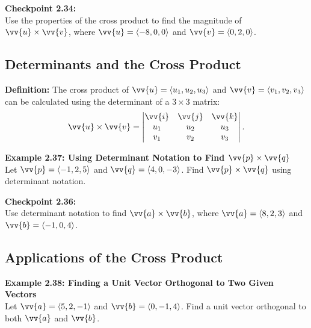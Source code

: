 \documentclass{article}
\begin{document}
\begin{exercisebox}
    \textbf{Checkpoint 2.34:} \\
    Use the properties of the cross product to find the magnitude of \(\vv{u} \times \vv{v}\), where \(\vv{u} = \langle -8, 0, 0 \rangle\) and \(\vv{v} = \langle 0, 2, 0 \rangle\).
\end{exercisebox}

\subsection*{Determinants and the Cross Product}

\begin{definitionbox}
    \textbf{Definition:} The cross product of \(\vv{u} = \langle u_1, u_2, u_3 \rangle\) and \(\vv{v} = \langle v_1, v_2, v_3 \rangle\) can be calculated using the determinant of a \(3 \times 3\) matrix:
    \[
    \vv{u} \times \vv{v} = \begin{vmatrix}
    \vv{i} & \vv{j} & \vv{k} \\
    u_1 & u_2 & u_3 \\
    v_1 & v_2 & v_3
    \end{vmatrix}.
    \]
\end{definitionbox}

\begin{examplebox}
    \textbf{Example 2.37: Using Determinant Notation to Find \(\vv{p} \times \vv{q}\)} \\
    Let \(\vv{p} = \langle -1, 2, 5 \rangle\) and \(\vv{q} = \langle 4, 0, -3 \rangle\). Find \(\vv{p} \times \vv{q}\) using determinant notation.
\end{examplebox}

\begin{exercisebox}
    \textbf{Checkpoint 2.36:} \\
    Use determinant notation to find \(\vv{a} \times \vv{b}\), where \(\vv{a} = \langle 8, 2, 3 \rangle\) and \(\vv{b} = \langle -1, 0, 4 \rangle\).
\end{exercisebox}

\subsection*{Applications of the Cross Product}

\begin{examplebox}
    \textbf{Example 2.38: Finding a Unit Vector Orthogonal to Two Given Vectors} \\
    Let \(\vv{a} = \langle 5, 2, -1 \rangle\) and \(\vv{b} = \langle 0, -1, 4 \rangle\). Find a unit vector orthogonal to both \(\vv{a}\) and \(\vv{b}\).
\end{examplebox}
\end{document}
